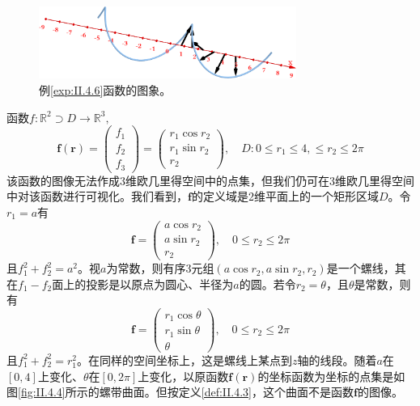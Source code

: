 \documentclass[main.tex]{subfiles}
\begin{document}
\begin{figure}[ht]
    \centering
    \includegraphics[width=0.75\textwidth]{images/II.4.3.png}
    \caption{例\ref{exp:II.4.6}函数的图象。}
    \label{fig:II.4.3}
\end{figure}
\begin{example}\label{exp:II.4.7}
    函数$f:\mathbb{R}^2\supset D\rightarrow\mathbb{R}^3,$
    \[
        \mathbf{f}\left(\mathbf{r}\right)=\left(\begin{array}{c}f_1\\f_2\\f_3\end{array}\right)=\left(\begin{array}{c}r_1\cos r_2\\r_1\sin r_2\\r_2\end{array}\right),\quad D: 0\leq r_1\leq 4,\leq r_2\leq 2\pi
    \]
    该函数的图像无法作成3维欧几里得空间中的点集，但我们仍可在3维欧几里得空间中对该函数进行可视化。我们看到，$\mathbf{f}$的定义域是2维平面上的一个矩形区域$D$。令$r_1=a$有
    \[
        \mathbf{f}=\left(\begin{array}{c}
                a\cos r_2 \\
                a\sin r_2 \\
                r_2
            \end{array}\right),\quad 0\leq r_2\leq 2\pi
    \]
    且$f_1^2+f_2^2=a^2$。视$a$为常数，则有序3元组$\left(a\cos r_2,a\sin r_2,r_2\right)$是一个螺线，其在$f_1-f_2$面上的投影是以原点为圆心、半径为$a$的圆。若令$r_2=\theta$，且$\theta$是常数，则有
    \[
        \mathbf{f}=\left(\begin{array}{c}
                r_1\cos \theta \\
                r_1\sin \theta \\
                \theta
            \end{array}\right),\quad 0\leq r_2\leq 2\pi
    \]
    且$f_1^2+f_2^2=r_1^2$。在同样的空间坐标上，这是螺线上某点到$z$轴的线段。随着$a$在$\left[0,4\right]$上变化、$\theta$在$\left[0,2\pi\right]$上变化，以原函数$\mathbf{f}\left(\mathbf{r}\right)$的坐标函数为坐标的点集是如图\ref{fig:II.4.4}所示的螺带曲面。但按定义\ref{def:II.4.3}，这个曲面不是函数$\mathbf{f}$的图像。
\end{example}
\end{document}
